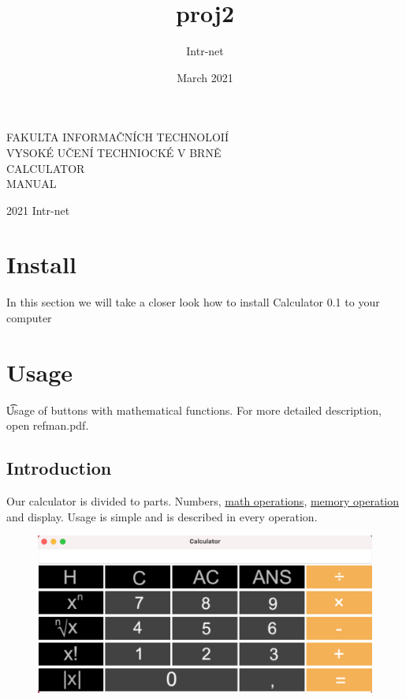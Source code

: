 \documentclass[11pt, a4paper]{article}
\title{proj2}
\author{Intr-net}
\date{March 2021}
\begin{document}
    \begin{titlepage}
        \begin{center}
            \vspace*{1cm}

            \huge
            \Huge F\huge AKULTA INFORMAČNÍCH TECHNOLOIÍ\\
            \hspace{0.2cm}
            \Huge V\huge YSOKÉ UČENÍ TECHNIOCKÉ V \Huge B\huge RNĚ\\
            CALCULATOR \\
            MANUAL


        \end{center}
        {\LARGE 2021 \hfill
        Intr-net}
    \end{titlepage}

    \newpage

    \tableofcontents


    \section{Install}
    \label{sec:install}
    In this section we will take a closer look how to install Calculator 0.1 to your computer


    \section{Usage}
    \t Usage of buttons with mathematical functions.
    For more detailed description, open refman.pdf.
    \label{sec:usage}

    \subsection{Introduction}
    \label{subsec:Introduction}
        Our calculator is divided to parts. Numbers, \href{subsec:mathOperations}{math operations}, \href{subsec:memoryoperations}{memory operation} and display. Usage is simple and is described in every operation.
        \newline
        \begin{figure}[h]
            \includegraphics[scale = 0.5]{Calc_screen.png}
            \centering
            \label{pic:calc}
        \end{figure}
        
\end{document}
